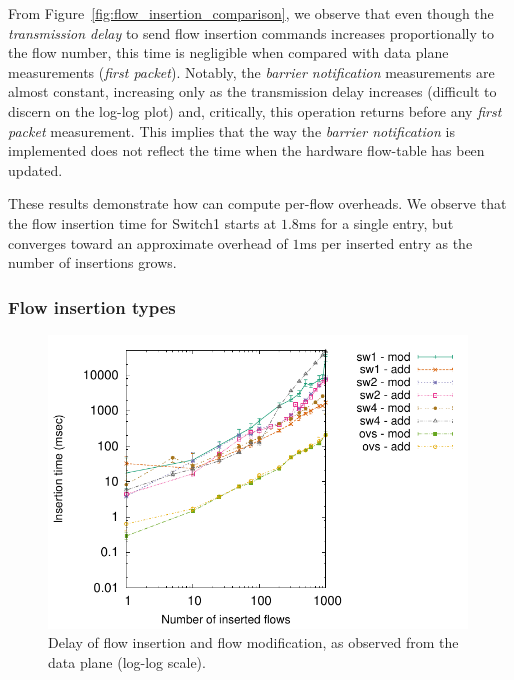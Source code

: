 From Figure~\ref{fig:flow_insertion_comparison}, we observe that even though the
\textit{transmission delay} to send flow insertion commands increases
proportionally to the flow number, this time is negligible when compared with
data plane measurements (\textit{first packet}). Notably, the \textit{barrier
  notification} measurements are almost constant, increasing only as the
transmission delay increases (difficult to discern on the log-log plot) and,
critically, this operation returns before any \textit{first packet} measurement.
This implies that the way the \textit{barrier notification} is implemented does
not reflect the time when the hardware flow-table has been updated.

These results demonstrate how \oflops can compute per-flow overheads. We
observe that the flow insertion time for Switch1 starts at $1.8$ms for a single
entry, but converges toward an approximate overhead of $1$ms per inserted entry
as the number of insertions grows.

\subsubsection*{Flow insertion types}

\begin{figure}[h]
  \begin{center}
    \includegraphics[width=0.99\textwidth]{Chapter1/Chapter1Figs/flow_insertion_delay}
  \end{center}
  \caption{Delay of flow insertion and flow modification, as observed
    from the data plane (log-log scale).}
  \label{fig:flow_insertion_delay}
\end{figure}

